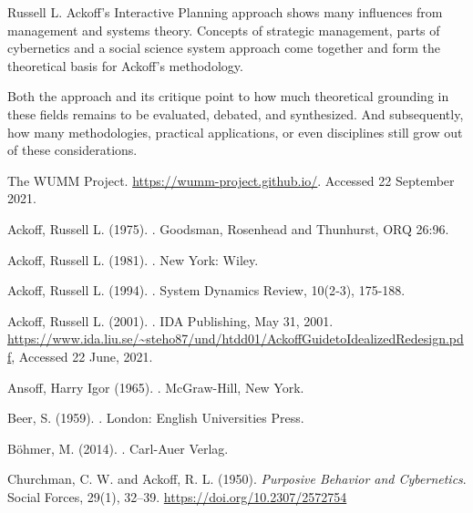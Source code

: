 \documentclass[a4paper,12pt]{article}
\begin{document}
Russell L. Ackoff's Interactive Planning approach shows many influences from
management and systems theory. Concepts of strategic management, parts of
cybernetics and a social science system approach come together and form the
theoretical basis for Ackoff's methodology.

Both the approach and its critique point to how much theoretical grounding in
these fields remains to be evaluated, debated, and synthesized. And
subsequently, how many methodologies, practical applications, or even
disciplines still grow out of these considerations.
\clearpage


\begin{thebibliography}{xxx}

 The WUMM Project.
  \newblock\url{https://wumm-project.github.io/}.  \newblock Accessed 22
  September 2021.

 Ackoff, Russell L. (1975).  .  \newblock Goodsman, Rosenhead and Thunhurst,
  ORQ 26:96.

 Ackoff, Russell L. (1981).  .  \newblock New York: Wiley.

 Ackoff, Russell L. (1994).  .  \newblock System Dynamics Review, 10(2‐3),
  175-188.

 Ackoff, Russell L. (2001).  .  \newblock IDA Publishing,
  May 31, 2001.  \newblock
  \url{https://www.ida.liu.se/~steho87/und/htdd01/AckoffGuidetoIdealizedRedesign.pdf},
  \newblock Accessed 22 June, 2021.

 Ansoff, Harry Igor (1965).  .
  \newblock McGraw-Hill, New York.

 Beer, S. (1959).  .  \newblock London: English Universities Press.

 Böhmer, M. (2014).  .  \newblock Carl-Auer Verlag.

 Churchman, C. W. and Ackoff, R. L. (1950).  \newblock
  {\em Purposive Behavior and Cybernetics}.  \newblock Social Forces, 29(1),
  32–39.  \newblock \url{https://doi.org/10.2307/2572754}


\end{thebibliography}
\end{document}
